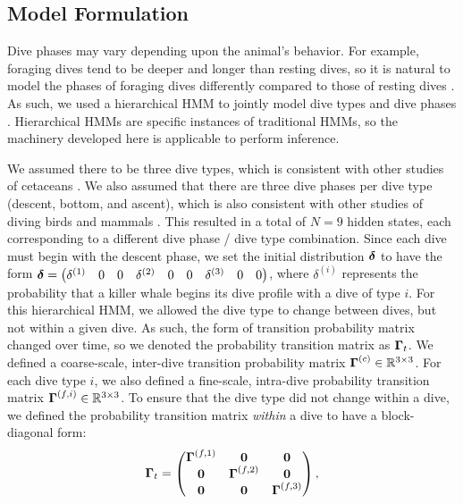 \subsection{Model Formulation}

Dive phases may vary depending upon the animal's behavior. For example, foraging dives tend to be deeper and longer than resting dives, so it is natural to model the phases of foraging dives differently compared to those of resting dives \citep{Tennessen:2019b}. As such, we used a hierarchical HMM to jointly model dive types and dive phases \citep{Barajas:2017}. Hierarchical HMMs are specific instances of traditional HMMs, so the machinery developed here is applicable to perform inference. 

We assumed there to be three dive types, which is consistent with other studies of cetaceans \citep[e.g. resting, foraging and traveling,][]{Barajas:2017}. We also assumed that there are three dive phases per dive type (descent, bottom, and ascent), which is also consistent with other studies of diving birds and mammals \citep[e.g.][]{Vivant:2014}. This resulted in a total of $N = 9$ hidden states, each corresponding to a different dive phase / dive type combination.
%
Since each dive must begin with the descent phase, we set the initial distribution $\boldsymbol{\delta}$ to have the form
%
    $\boldsymbol{\delta} = \begin{pmatrix} \delta^{(1)} & 0 & 0 & \delta^{(2)} & 0 & 0 & \delta^{(3)} & 0 & 0 \end{pmatrix}$,
%
where $\delta^{(i)}$ represents the probability that a killer whale begins its dive profile with a dive of type $i$. 
%
For this hierarchical HMM, we allowed the dive type to change between dives, but not within a given dive. As such, the form of transition probability matrix changed over time, so we denoted the probability transition matrix as $\boldsymbol{\Gamma}_t$. We defined a coarse-scale, inter-dive transition probability matrix $\boldsymbol{\Gamma}^{(c)} \in \mathbb{R}^{3 \times 3}$. For each dive type $i$, we also defined a fine-scale, intra-dive probability transition matrix $\boldsymbol{\Gamma}^{(f,i)} \in \mathbb{R}^{3 \times 3}$. 
%
To ensure that the dive type did not change within a dive, we defined the probability transition matrix \textit{within} a dive to have a block-diagonal form:
%
\begin{equation}
    \boldsymbol{\Gamma}_t = 
    \begin{pmatrix}
        \boldsymbol{\Gamma}^{(f,1)} & \mathbf{0} & \mathbf{0} \\
        \mathbf{0} & \boldsymbol{\Gamma}^{(f,2)} & \mathbf{0} \\
        \mathbf{0} & \mathbf{0} & \boldsymbol{\Gamma}^{(f,3)} \\
    \end{pmatrix},
\end{equation}
